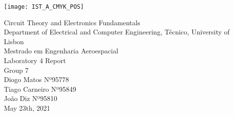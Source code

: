 
\thispagestyle {empty}

\texttt{[image: IST\_A\_CMYK\_POS]}

\begin{center}
%
\vspace{1.0cm}

\vspace{1cm}
{\FontLb Circuit Theory and Electronics Fundamentals} \\ %
\vspace{1cm}
{\FontSn Department of Electrical and Computer Engineering, Técnico, University of Lisbon} \\ %
{\FontSn Mestrado em Engenharia Aeroespacial} \\
\vspace{3cm}
{\FontSn Laboratory 4 Report} \\[1cm]
{\FontSn Group 7} \\[2cm]
{\FontSn Diogo Matos Nº95778} \\
{\FontSn Tiago Carneiro Nº95849} \\
{\FontSn João Diz Nº95810} \\
\vspace{10cm}
{\FontSn May 23th, 2021} \\ %
%
\end{center}

